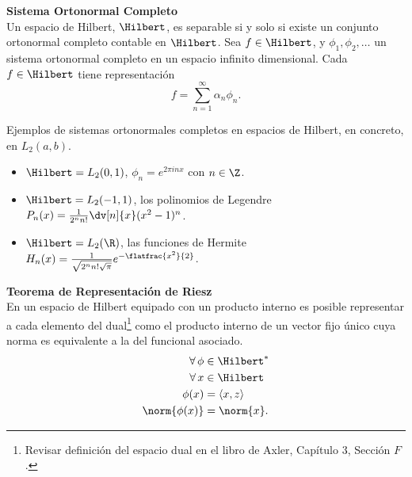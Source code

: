 \begin{mdframed}[style=warning]
	{\large \textbf{Sistema Ortonormal Completo}} \\
	Un espacio de Hilbert, $\Hilbert$, es separable si y solo si existe un conjunto ortonormal completo contable en $\Hilbert$. Sea $f\in \Hilbert$, y $\phi _1, \phi _2,\ldots$ un sistema ortonormal completo en un espacio infinito dimensional. Cada $f\in \Hilbert$ tiene representación
		$$ f = \sum _{n = 1} ^\infty \alpha _n \phi _n .$$
\end{mdframed}

Ejemplos de sistemas ortonormales completos en espacios de Hilbert, en concreto, en $L_2 (a,b)$.

\begin{itemize}
	\item $\Hilbert = L_2 (0,1)$, $\phi _n = e^{2\pi i nx}$ con $n \in \Z$.
	\item $\Hilbert = L_2 (-1,1)$, los polinomios de Legendre $P_n (x) = \frac{1}{2^n n!} \dv[n]{x} (x^2 - 1)^n$.
	\item $\Hilbert = L_2 (\R)$, las funciones de Hermite $H _n (x) = \frac{1}{\sqrt{2^n n! \sqrt{\pi}}} e^{-\flatfrac{x^2}{2}}$.
\end{itemize}


\begin{mdframed}[style=warning]
	{\large \textbf{Teorema de Representación de Riesz}} \\
	En un espacio de Hilbert equipado con un producto interno es posible representar a cada elemento del dual\footnote{Revisar definición del espacio dual en el libro de Axler, Capítulo $3$, Sección $F$.} como el producto interno de un vector fijo único cuya norma es equivalente a la del funcional asociado.
	\begin{align*}
		\forall \, \phi &\in \Hilbert ^* \\
		\forall \, x &\in \Hilbert \\
		\phi (x) &= \inner{x}{z} \\
		\norm{\phi (x)} &= \norm{x} .
	\end{align*}
\end{mdframed}




